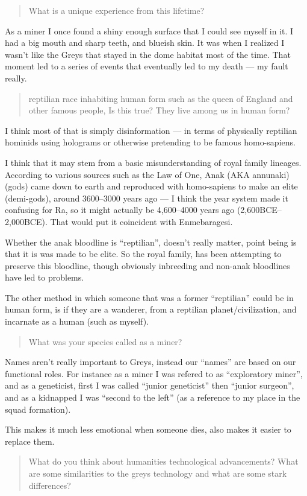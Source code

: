 \blockquote{What is a unique experience from this lifetime?}

 As a miner I once found a shiny enough surface that I could see myself in it. I had a big mouth and sharp teeth, and blueish skin. It was when I realized I wasn't like the Greys that stayed in the dome habitat most of the time. That moment led to a series of events that eventually led to my death --- my fault really. 

\blockquote{reptilian race inhabiting human form such as the queen of England and other famous people, Is this true? They live among us in human form? }

I think most of that is simply disinformation --- in terms of physically
reptilian hominids using holograms or otherwise pretending to be famous
homo-sapiens.

I think that it may stem from a basic misunderstanding of royal family lineages.
According to various sources such as the Law of One, Anak (AKA annunaki) (gods)
came down to earth and reproduced with homo-sapiens to make an elite
(demi-gods), around 3600--3000 years ago --- I think the year system made it
confusing for Ra, so it might actually be 4,600--4000 years ago 
(2,600BCE--2,000BCE). That would put it coincident with Enmebaragesi.

Whether the anak bloodline is ``reptilian'', doesn't really matter, point being is
that it is was made to be elite. So the royal family, has been attempting to
preserve this bloodline, though obviously inbreeding and non-anak bloodlines
have led to problems.

The other method in which someone that was a former ``reptilian'' could be in
human form, is if they are a wanderer, from a reptilian planet/civilization, and
incarnate as a human (such as myself).

\blockquote{What was your species called as a miner?}

Names aren't really important to Greys, instead our ``names'' are based on our
functional roles. For instance as a miner I was refered to as ``exploratory
miner'', and as a geneticist, first I was called ``junior geneticist'' then 
``junior surgeon'', and as a kidnapped I was ``second to the left'' (as a
reference to my
place in the squad formation).

This makes it much less emotional when someone dies, also makes it easier to
replace them.

\blockquote{What do you think about humanities technological advancements? What
are some similarities to the greys technology and what are some stark
differences?}

